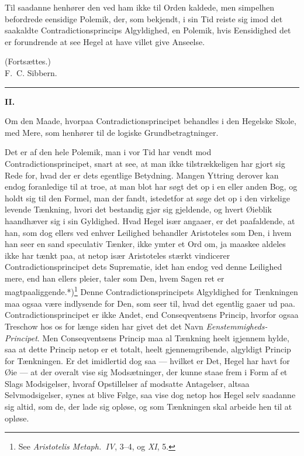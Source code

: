 \documentclass[12pt,a4paper]{book}
\newcommand{\apage}[1]{\marginnote{\footnotesize\textit{[#1]}}}
\begin{document}
Til saadanne henhører den ved ham ikke til Orden kaldede, men simpelhen
befordrede eensidige Polemik, der, som bekjendt, i sin Tid reiste sig imod
det saakaldte Contradictionsprincips Algyldighed, en Polemik, hvis
Eensidighed det er forundrende at see Hegel at have villet give Anseelse.

\nopagebreak
\begin{flushright}
(Fortsættes.)\\[0.6em]
F.\ C. Sibbern.
\end{flushright}

\begin{center}
\rule{0.3\textwidth}{0.4pt}
\end{center}

%
\bigskip
\begin{center}
\apage{79} {\large\textbf{II.}}

\medskip
Om den Maade, hvorpaa Contradictionsprincipet behandles i den
Hegelske Skole, med Mere, som henhører til de logiske Grundbetragtninger.
\end{center}
\bigskip

Det er af den hele Polemik, man i vor Tid har vendt mod
Contradictionsprincipet, snart at see, at man ikke tilstrækkeligen har
gjort sig Rede for, hvad der er dets egentlige Betydning. Mangen Yttring
derover kan endog foranledige til at troe, at man blot har søgt det op i en
eller anden Bog, og holdt sig til den Formel, man der fandt, istedetfor at
søge det op i den virkelige levende Tænkning, hvori det bestandig gjør sig
gjeldende, og hvert Øieblik haandhæver sig i sin Gyldighed. Hvad Hegel især
angaaer, er det paafaldende, at han, som dog ellers ved enhver Leilighed
behandler Aristoteles som Den, i hvem han seer en sand speculativ Tænker,
ikke ymter et Ord om, ja maaskee aldeles ikke har tænkt paa, at netop især
Aristoteles stærkt vindicerer Contradictionsprincipet dets Suprematie, idet
han endog ved denne Leilighed mere, end han ellers pleier, taler som Den,
hvem Sagen ret er magtpaaliggende.*)\footnote{See \textit{Aristotelis
Metaph.\ IV}, 3--4, og \textit{XI}, 5.} Denne Contradictionsprincipets
Algyldighed for Tænkningen maa ogsaa være indlysende for Den, som seer til,
hvad det egentlig gaaer ud paa. Contradictionsprincipet er ikke Andet, end
Conseqventsens Princip, hvorfor ogsaa Treschow hos \apage{80} os for længe siden har
givet det det Navn \emph{Eenstemmigheds-Principet}. Men Conseqventsens Princip maa
al Tænkning heelt igjennem hylde, saa at dette Princip netop er et totalt,
heelt gjennemgribende, algyldigt Princip for Tænkningen. Er det imidlertid
dog saa --- hvilket er Det, Hegel har havt for Øie --- at der overalt vise
sig Modsætninger, der kunne staae frem i Form af et Slags Modsigelser,
hvoraf Opstillelser af modsatte Antagelser, altsaa Selvmodsigelser, synes
at blive Følge, saa vise dog netop hos Hegel selv saadanne sig altid, som
de, der lade sig opløse, og som Tænkningen skal arbeide hen til at opløse.
\end{document}
